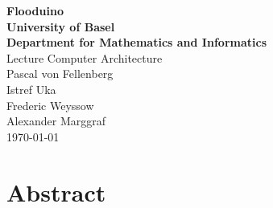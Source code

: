 \documentclass[10pt, a4paper]{article}
\begin{document}
\begin{titlepage}
\begin{center}
{\Huge \textbf{Flooduino}}\\
\vspace*{1cm}
{\textbf{\LARGE University of Basel\\ \Large {Department for Mathematics and Informatics}}}\\
\vspace*{0.5cm}
{\Large Lecture Computer Architecture}\\
\vspace*{0.5cm}
Pascal von Fellenberg\\ Istref Uka\\ Frederic Weyssow\\ Alexander Marggraf\\
\vspace*{0.5cm}
\today
\end{center}
\end{titlepage}


\section*{Abstract}
\end{document}
